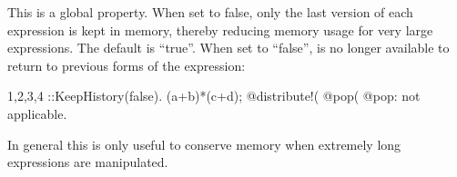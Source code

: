 
This is a global property. When set to false, only the last version of
each expression is kept in memory, thereby reducing memory usage for
very large expressions. The default is ``true''. When set to
``false'',  is no longer available to return to
previous forms of the expression:
\begin{screen}{1,2,3,4}
::KeepHistory(false).
(a+b)*(c+d);
@distribute!(%
@pop(%
@pop: not applicable.
\end{screen}
In general this is only useful to conserve memory when extremely long
expressions are manipulated.

